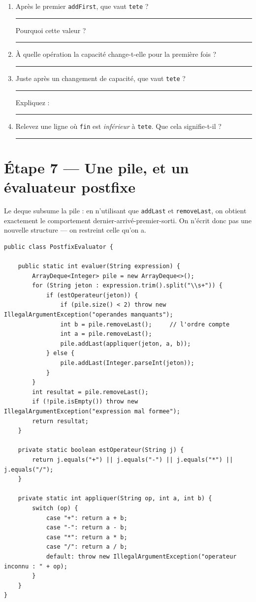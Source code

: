 \documentclass[11pt,a4paper]{article}
\newcommand{\lig}[1]{\rule{#1}{0.4pt}}
\begin{document}
\begin{exercicebox}
\begin{enumerate}[nosep]
    \item Après le premier \texttt{addFirst}, que vaut \texttt{tete} ?
          \lig{2.5cm} \quad Pourquoi cette valeur ? \lig{6cm}
    \item À quelle opération la capacité change-t-elle pour la première
          fois ? \lig{5cm}
    \item Juste après un changement de capacité, que vaut \texttt{tete} ?
          \lig{2.5cm} \quad Expliquez : \lig{7cm}
    \item Relevez une ligne où \texttt{fin} est \emph{inférieur} à
          \texttt{tete}. Que cela signifie-t-il ? \lig{7cm}
\end{enumerate}
\end{exercicebox}

\section{Étape 7 --- Une pile, et un évaluateur postfixe}

\begin{lienbox}[Ce qu'on matérialise du CM]
Le deque subsume la pile : en n'utilisant que \texttt{addLast} et
\texttt{removeLast}, on obtient exactement le comportement
dernier-arrivé-premier-sorti. On n'écrit donc pas une nouvelle structure ---
on restreint celle qu'on a.
\end{lienbox}

\begin{lstlisting}[caption={\texttt{PostfixEvaluator.java}}]
public class PostfixEvaluator {

    public static int evaluer(String expression) {
        ArrayDeque<Integer> pile = new ArrayDeque<>();
        for (String jeton : expression.trim().split("\\s+")) {
            if (estOperateur(jeton)) {
                if (pile.size() < 2) throw new IllegalArgumentException("operandes manquants");
                int b = pile.removeLast();     // l'ordre compte
                int a = pile.removeLast();
                pile.addLast(appliquer(jeton, a, b));
            } else {
                pile.addLast(Integer.parseInt(jeton));
            }
        }
        int resultat = pile.removeLast();
        if (!pile.isEmpty()) throw new IllegalArgumentException("expression mal formee");
        return resultat;
    }

    private static boolean estOperateur(String j) {
        return j.equals("+") || j.equals("-") || j.equals("*") || j.equals("/");
    }

    private static int appliquer(String op, int a, int b) {
        switch (op) {
            case "+": return a + b;
            case "-": return a - b;
            case "*": return a * b;
            case "/": return a / b;
            default: throw new IllegalArgumentException("operateur inconnu : " + op);
        }
    }
}
\end{lstlisting}
\end{document}
